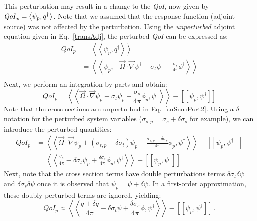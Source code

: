 \documentclass[12pt]{report}
\newcommand{\vO}{\vec{\Omega}}
\newcommand{\bra}{\left\langle}
\newcommand{\ket}{\right\rangle}
\newcommand{\braSN}{\left\langle \! \left\langle}
\newcommand{\ketSN}{\right\rangle \! \right\rangle}
\newcommand{\sbraSN}{\left[ \! \left[}
\newcommand{\sketSN}{\right] \! \right]}
\newcommand{\grad}{\vec{\nabla}}
\newcommand{\sigt}{\sigma_t}
\newcommand{\sigs}{\sigma_s}
\newcommand{\angSourcep}{\frac{q_p}{4 \pi}}
\newcommand{\angResp}{q^\dag}
\newcommand{\qoi}{{\it QoI}\xspace}
\begin{document}
This perturbation may result in a change to the \qoi, now given by $\qoi_p=\bra \psi_p , \angResp \ket$. Note that we assumed that the response function (adjoint source) was not affected by the perturbation. Using the {\it unperturbed} adjoint equation given in Eq.~\eqref{transAdj},
the perturbed \qoi can be expressed as:
\begin{equation}
\label{snSensPart}
\begin{split}
QoI_p &=\braSN \psi_p , \angResp \ketSN \\
&=\braSN \psi_p , - \vO \cdot \grad \psi^\dag + \sigt \psi^\dag - \frac{\sigs}{4 \pi} \phi^\dag  \ketSN \\
\end{split}
\end{equation}
Next, we perform an integration by parts and obtain:
\begin{equation}
\label{snSensPart2}
QoI_p = \braSN  \vO \cdot \grad \psi_p + \sigt \psi_p - \frac{\sigs}{4 \pi} \phi_p , \psi^\dag  \ketSN - \sbraSN \psi_p, \psi^\dag \sketSN
\end{equation}
Note that the cross sections are unperturbed in Eq.~\eqref{snSensPart2}.
Using a $\delta$ notation for the perturbed system variables ($\sigma_{s,p} = \sigs + \delta \sigs$ for example), we
can introduce the perturbed quantities:
\begin{equation}
\label{snSensPart3}
\begin{split}
QoI_p &= \braSN  \vO \cdot \grad \psi_p + (\sigma_{t,p}- \delta\sigt)\psi_p - \frac{\sigma_{s,p}-\delta \sigs}{4 \pi} \phi_p
 , \psi^\dag  \ketSN - \sbraSN \psi_p, \psi^\dag \sketSN \\
 &= \braSN  \angSourcep - \delta\sigt\psi_p + \frac{\delta \sigs}{4 \pi} \phi_p
 , \psi^\dag  \ketSN - \sbraSN \psi_p, \psi^\dag \sketSN
\end{split}
\end{equation}
Next, note that the cross section terms have double perturbations terms $\delta \sigt \delta \psi$ and $\delta \sigs \delta \psi$ once it is observed
that $\psi_p=\psi+\delta\psi$. In a first-order approximation, these doubly perturbed terms are ignored, yielding:
\begin{equation}
\label{snAdjQoIp}
QoI_p \approx \braSN  \frac{q+\delta q}{4\pi} - \delta\sigt\psi + \frac{\delta \sigs}{4 \pi} \phi
 , \psi^\dag  \ketSN - \sbraSN \psi_p, \psi^\dag \sketSN \,.
\end{equation}
\end{document}

